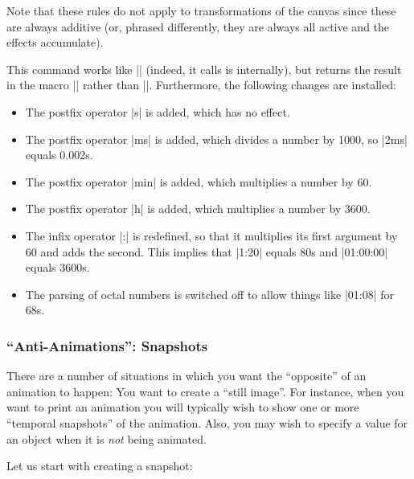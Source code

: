Note that these rules do not apply to transformations of the canvas since these
are always additive (or, phrased differently, they are always all active and
the effects accumulate).

\begin{command}{\pgfparsetime{}}
    This command works like |\pgfmathparse| (indeed, it calls is internally),
    but returns the result in the macro |\pgftimeresult| rather than
    |\pgfmathresult|. Furthermore, the following changes are installed:
    \begin{itemize}
        \item The postfix operator |s| is added, which has no effect.
        \item The postfix operator |ms| is added, which divides a number by
            1000, so |2ms| equals 0.002s.
        \item The postfix operator |min| is added, which multiplies a number by
            60.
        \item The postfix operator |h| is added, which multiplies a number by
            3600.
        \item The infix operator |:| is redefined, so that it multiplies its
            first argument by 60 and adds the second. This implies that |1:20|
            equals 80s and |01:00:00| equals 3600s.
        \item The parsing of octal numbers is switched off to allow things like
            |01:08| for 68s.
    \end{itemize}
\end{command}


\subsubsection{``Anti-Animations'': Snapshots}

There are a number of situations in which you want the ``opposite'' of an
animation to happen: You want to create a ``still image''. For instance, when
you want to print an animation you will typically wish to show one or more
``temporal snapshots'' of the animation. Also, you may wish to specify a value
for an object when it is \emph{not} being animated.

Let us start with creating a snapshot:


